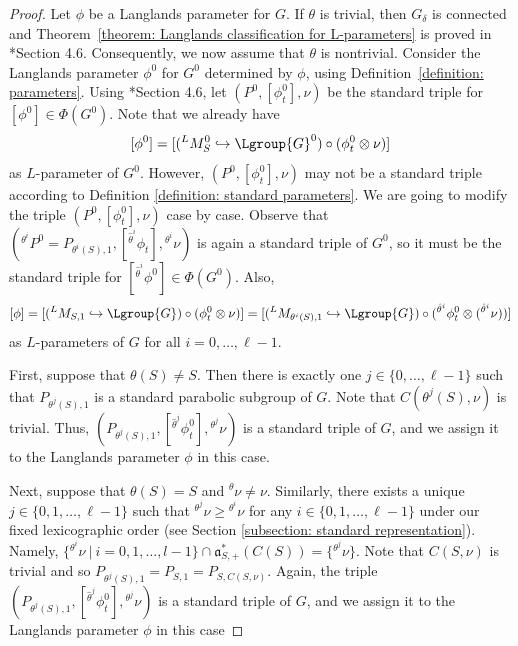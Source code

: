 \documentclass[11pt,letterpaper]{amsart}
\numberwithin{equation}{section}
\begin{document}
\begin{proof}
Let $\phi$ be a Langlands parameter for $G$.
 If $\theta$ is trivial, then $G_\delta$ is connected and Theorem~\ref{theorem: Langlands classification for L-parameters} is proved in \cite{SZ18}*{Section 4.6}.
    Consequently, we now assume that $\theta$ is nontrivial.
Consider the Langlands parameter $\phi^0$ for $G^0$ determined by $\phi$, using Definition~\ref{definition: parameters}.
Using \cite{SZ18}*{Section 4.6}, let $(P^0, [\phi^0_t], \nu)$ be the standard triple for $[\phi^0] \in \Phi(G^0)$. Note that we already have 
\[[\phi^0]= [ ({}^LM_S^0 \hookrightarrow \Lgroup{G}^0) \circ (\phi_t^0 \otimes \nu)]\]
as $L$-parameter of $G^0$. However, $(P^0, [\phi^0_t], \nu)$ may not be a standard triple according to Definition \ref{definition: standard parameters}. We are going to modify the triple $(P^0, [\phi^0_t], \nu)$ case by case. Observe that
    $({}^{\theta^i} P^0= P_{\theta^i(S),1}, [{}^{{\hat\theta}^i}\phi_t], {}^{\theta^i}\nu)$ is again a standard triple of $G^0$, so it must be the standard triple for $[{}^{{\hat\theta}^i}{\phi^0}]\in \Phi(G^0)$. Also,
    \[ [\phi]= [ ({}^LM_{S,1} \hookrightarrow \Lgroup{G}) \circ (\phi_t^0 \otimes \nu)]=  [ ({}^LM_{\theta^i(S),1} \hookrightarrow \Lgroup{G}) \circ ({}^{{\hat\theta}^i}\phi_t^0 \otimes ({}^{{\hat\theta}^i}\nu))] \]
    as $L$-parameters of $G$ for all $i=0,\ldots, \ell-1$.
    

    First, suppose that $\theta(S)\neq S$. Then there is exactly one $j\in\{0,\dots,\ell-1\}$ such that $P_{\theta^j({S}),1}$ is a standard parabolic subgroup of $G$. Note that $C({\theta^j(S)},\nu)$ is trivial. Thus, $( P_{\theta^j(S),1}, [{}^{{\hat\theta}^j}\phi_t^0], {}^{\theta^j}\nu) $ is a standard triple of $G$, and we assign it to the Langlands parameter $\phi$ in this case.
    

    Next, suppose that $\theta(S)=S$ and $^\theta \nu \neq \nu$. Similarly, there exists a unique $j\in\{0,1,\dots,\ell-1\}$ such that ${}^{\theta^j}\nu\geq {}^{\theta^i}\nu$ for any $i\in\{0,1,\dots,\ell-1\}$ under our fixed lexicographic order (see Section \ref{subsection: standard representation}). Namely,  $\{{}^{\theta^i}\nu \ | \ i=0,1,\dots,l-1\} \cap \mathfrak{a}_{S,+}^{\ast}(C(S))= \{{}^{\theta^j}\nu\}$. Note that $C({S},\nu)$ is trivial and so $P_{\theta^j(S),1}=P_{S,1}=P_{{S},C({S},\nu)}$. Again, the triple $( P_{\theta^j(S),1}, [{}^{{\hat\theta}^j}\phi_t^0], {}^{\theta^j}\nu) $ is a standard triple of $G$, and we assign it to the Langlands parameter $\phi$ in this case


\end{proof}
\end{document}
